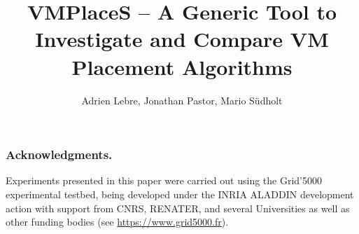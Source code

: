 \documentclass[runningheads,a4paper]{llncs2e/llncs}
\begin{document}
\title{VMPlaceS – A Generic Tool to Investigate and Compare VM Placement Algorithms}
%
%
\author{Adrien Lebre, Jonathan Pastor, Mario S\"udholt}
%


\maketitle






%
%

%

\subsubsection{Acknowledgments.}
Experiments presented in this paper were carried out using the Grid'5000 experimental
testbed, being developed under the INRIA ALADDIN development action with support from
CNRS, RENATER, and several Universities as well as other funding bodies (see
\url{https://www.grid5000.fr}).



\end{document}
